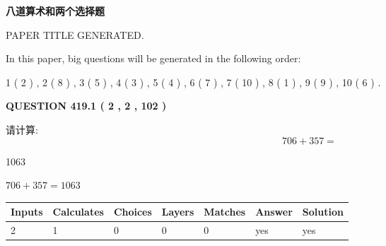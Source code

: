 \documentclass{ctexart}
\begin{document}
   
   
   
   
   
 \vspace{0.2in}
{\LARGE {\textbf{ 八道算术和两个选择题}}}
   
   
 PAPER TITLE GENERATED.
   
   
   
\vspace{0.2in}
   
In this paper, big questions will be generated in the following order: 
   
   
   1 ( 2 )
 ,
   2 ( 8 )
 ,
   3 ( 5 )
 ,
   4 ( 3 )
 ,
   5 ( 4 )
 ,
   6 ( 7 )
 ,
   7 ( 10 )
 ,
   8 ( 1 )
 ,
   9 ( 9 )
 ,
   10 ( 6 )
 .
  
\vspace{0.2in}
  
{\textbf{\Large{QUESTION
419.1 
 ( 2 , 2 , 102 )
}}}
  
  
 
请计算:
\begin{equation}
706 +  %
357 = \nonumber
\end{equation}
 
 
 
\noindent{}
 
 

1063
 
 
\noindent{}
 
 

 
 
 
\noindent{}
 
 

$ %
706 +  %
357=   %
1063$
 
 
\noindent{}
 
 

 
   
   
   
   
\noindent\begin{tabular}{|l|l|l|l|l|l|l|}
 \hline
Inputs & Calculates & Choices & Layers & Matches & Answer & Solution \\ \hline
 2  & 
 1  & 
 0
  & 
 0  & 
 0  & 
  yes & 
  yes 
  \\ \hline
 \end{tabular}
   
\end{document}
